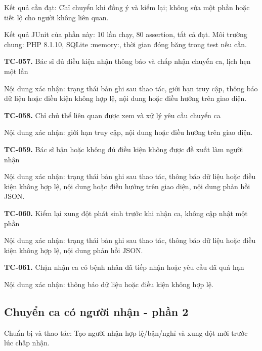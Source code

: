 Kết quả cần đạt:\allowbreak{} Chỉ chuyển khi đồng ý và kiểm lại; không sửa một phần hoặc tiết lộ cho người không liên quan.\allowbreak{}

Kết quả JUnit của phần này:\allowbreak{} 10 lần chạy, 80 assertion, tất cả đạt.\allowbreak{} Môi trường chung:\allowbreak{} PHP 8.\allowbreak{}1.\allowbreak{}10, SQLite :\allowbreak{}memory:\allowbreak{}, thời gian đóng băng trong test nếu cần.\allowbreak{}

\noindent\textbf{TC-057.} Bác sĩ đủ điều kiện nhận thông báo và chấp nhận chuyển ca, lịch hẹn một lần\par
Nội dung xác nhận:\allowbreak{} trạng thái bản ghi sau thao tác, giới hạn truy cập, thông báo dữ liệu hoặc điều kiện không hợp lệ, nội dung hoặc điều hướng trên giao diện.\allowbreak{}

\noindent\textbf{TC-058.} Chỉ chủ thể liên quan được xem và xử lý yêu cầu chuyển ca\par
Nội dung xác nhận:\allowbreak{} giới hạn truy cập, nội dung hoặc điều hướng trên giao diện.\allowbreak{}

\noindent\textbf{TC-059.} Bác sĩ bận hoặc không đủ điều kiện không được đề xuất làm người nhận\par
Nội dung xác nhận:\allowbreak{} trạng thái bản ghi sau thao tác, thông báo dữ liệu hoặc điều kiện không hợp lệ, nội dung hoặc điều hướng trên giao diện, nội dung phản hồi JSON.\allowbreak{}

\noindent\textbf{TC-060.} Kiểm lại xung đột phát sinh trước khi nhận ca, không cập nhật một phần\par
Nội dung xác nhận:\allowbreak{} trạng thái bản ghi sau thao tác, thông báo dữ liệu hoặc điều kiện không hợp lệ, nội dung phản hồi JSON.\allowbreak{}

\noindent\textbf{TC-061.} Chặn nhận ca có bệnh nhân đã tiếp nhận hoặc yêu cầu đã quá hạn\par
Nội dung xác nhận:\allowbreak{} thông báo dữ liệu hoặc điều kiện không hợp lệ.\allowbreak{}


\par\vspace{8pt}

\subsection{Chuyển ca có người nhận - phần 2}
Chuẩn bị và thao tác:\allowbreak{} Tạo người nhận hợp lệ/\allowbreak{}bận/\allowbreak{}nghỉ và xung đột mới trước lúc chấp nhận.\allowbreak{}

